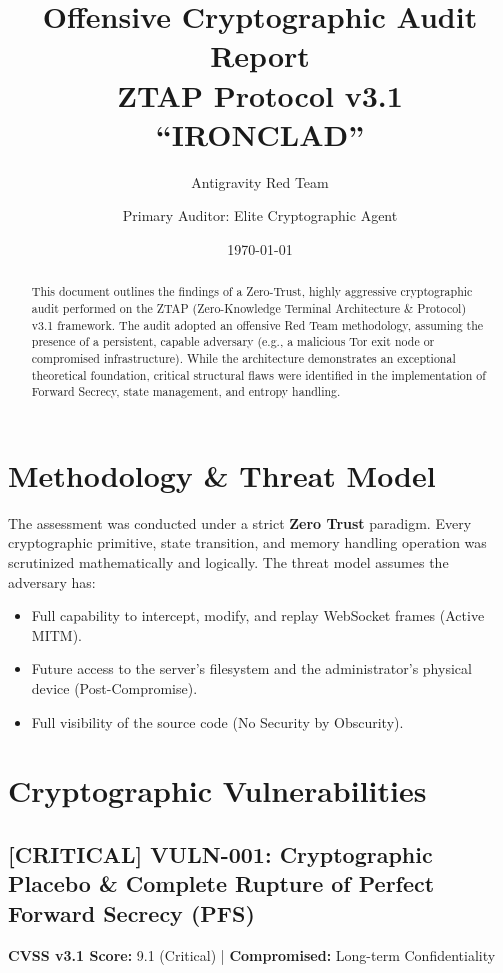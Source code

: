 \documentclass[11pt,a4paper]{article}
\title{\textbf{Offensive Cryptographic Audit Report}\\ \Large ZTAP Protocol v3.1 ``IRONCLAD''}
\author{Antigravity Red Team \and Primary Auditor: Elite Cryptographic Agent}
\date{\today}
\begin{document}
\maketitle

\begin{abstract}
This document outlines the findings of a Zero-Trust, highly aggressive cryptographic audit performed on the ZTAP (Zero-Knowledge Terminal Architecture \& Protocol) v3.1 framework. The audit adopted an offensive Red Team methodology, assuming the presence of a persistent, capable adversary (e.g., a malicious Tor exit node or compromised infrastructure). While the architecture demonstrates an exceptional theoretical foundation, critical structural flaws were identified in the implementation of Forward Secrecy, state management, and entropy handling.
\end{abstract}

\section{Methodology \& Threat Model}
The assessment was conducted under a strict \textbf{Zero Trust} paradigm. Every cryptographic primitive, state transition, and memory handling operation was scrutinized mathematically and logically. The threat model assumes the adversary has:
\begin{itemize}
    \item Full capability to intercept, modify, and replay WebSocket frames (Active MITM).
    \item Future access to the server's filesystem and the administrator's physical device (Post-Compromise).
    \item Full visibility of the source code (No Security by Obscurity).
\end{itemize}

\section{Cryptographic Vulnerabilities}

\subsection*{\textcolor{critical}{[CRITICAL]} VULN-001: Cryptographic Placebo \& Complete Rupture of Perfect Forward Secrecy (PFS)}
\textbf{CVSS v3.1 Score:} 9.1 (Critical) | \textbf{Compromised:} Long-term Confidentiality
\vspace{0.5cm}
\end{document}

